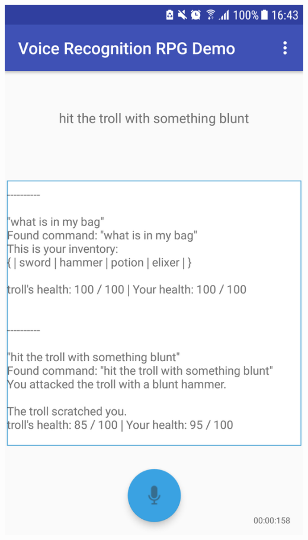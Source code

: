 \documentclass[11pt]{article}
\begin{document}
\begin{appendices}
\begin{center}
\includegraphics[scale=0.18]{battle-2.png}
\newpage

\end{center}
\end{appendices}
\end{document}
